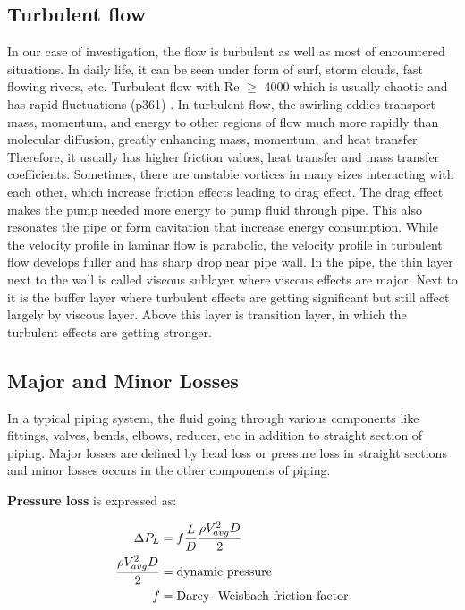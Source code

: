 \subsection{Turbulent flow}

In our case of investigation, the flow is turbulent as well as most of encountered situations. In daily life, it can be seen under form of surf, storm clouds, fast flowing rivers, etc. Turbulent flow with Re $\geq$ 4000 which is usually chaotic and has rapid fluctuations (p361) \cite{cengel:book}. In turbulent flow, the swirling eddies transport mass, momentum, and energy to other regions of flow much more rapidly than molecular diffusion, greatly enhancing mass, momentum, and heat transfer. Therefore, it usually has higher friction values, heat transfer and mass transfer coefficients. Sometimes, there are unstable vortices in many sizes interacting with each other, which increase friction effects leading to drag effect. The drag effect makes the pump needed more energy to pump fluid through pipe. This  also resonates the pipe or form cavitation that increase energy consumption. While the velocity profile in laminar flow is parabolic, the velocity profile in turbulent flow develops fuller and has sharp drop near pipe wall.  In the pipe, the thin layer next to the wall is called viscous sublayer where viscous effects are major. Next to it is the buffer layer where turbulent effects are getting significant but still affect largely by viscous layer. Above this layer is transition layer, in which the turbulent effects are getting stronger. 

\subsection{Major and Minor Losses}
In a typical piping system, the fluid going through various components like fittings, valves, bends, elbows, reducer, etc in addition to straight section of piping. Major losses are defined by head loss or pressure loss in straight sections and minor losses occurs in the other components of piping. 

\textbf{Pressure loss} is expressed as:

\begin{align}
\Delta P_L & = f \frac{L}{D} \frac{\rho V_{avg}^2 D }{2}   \\
\frac{\rho V_{avg}^2 D }{2}   & = \textnormal{dynamic pressure} \\
f & = \textnormal{Darcy- Weisbach friction factor} 
\end{align}

